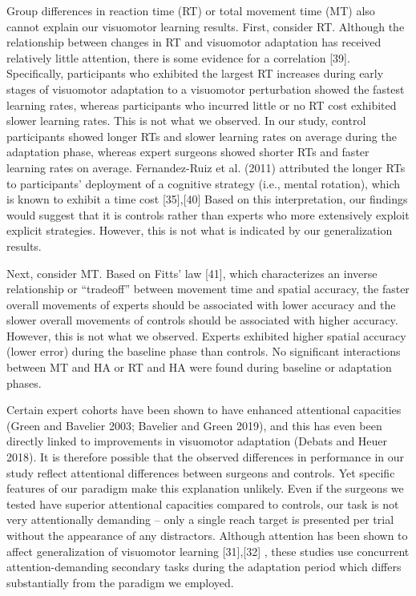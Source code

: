 \documentclass[jou, apacite, 11pt, longtable, floatsintext, notab]{apa6}
\begin{document}
Group differences in reaction time (RT) or total movement
time (MT) also cannot explain our visuomotor learning
results. First, consider RT. Although the relationship
between changes in RT and visuomotor adaptation has received
relatively little attention, there is some evidence for a
correlation [39]. Specifically, participants who exhibited
the largest RT increases during early stages of visuomotor
adaptation to a visuomotor perturbation showed the fastest
learning rates, whereas participants who incurred little or
no RT cost exhibited slower learning rates. This is not what
we observed. In our study, control participants showed
longer RTs and slower learning rates on average during the
adaptation phase, whereas expert surgeons showed shorter RTs
and faster learning rates on average. Fernandez-Ruiz et al.
(2011) attributed the longer RTs to participants’ deployment
of a cognitive strategy (i.e., mental rotation), which is
known to exhibit a time cost [35],[40] Based on this
interpretation, our findings would suggest that it is
controls rather than experts who more extensively exploit
explicit strategies. However, this is not what is indicated
by our generalization results.

Next, consider MT. Based on Fitts’ law [41], which
characterizes an inverse relationship or “tradeoff” between
movement time and spatial accuracy, the faster overall
movements of experts should be associated with lower
accuracy and the slower overall movements of controls should
be associated with higher accuracy. However, this is not
what we observed. Experts exhibited higher spatial accuracy
(lower error) during the baseline phase than controls. No
significant interactions between MT and HA or RT and HA were
found during baseline or adaptation phases.

Certain expert cohorts have been shown to have enhanced
attentional capacities (Green and Bavelier 2003; Bavelier
and Green 2019), and this has even been directly linked to
improvements in visuomotor adaptation (Debats and Heuer
2018). It is therefore possible that the  observed
differences in performance in our study reflect attentional differences
between surgeons and controls. Yet specific features of our
paradigm make this explanation unlikely. Even if the
surgeons we tested have superior attentional capacities
compared to controls, our task is not very attentionally
demanding – only a single reach target is presented per
trial without the appearance of any distractors. Although
attention has been shown to affect generalization of
visuomotor learning [31],[32] , these studies use concurrent
attention-demanding secondary tasks during the adaptation
period which differs substantially from the paradigm we
employed.
\end{document}
